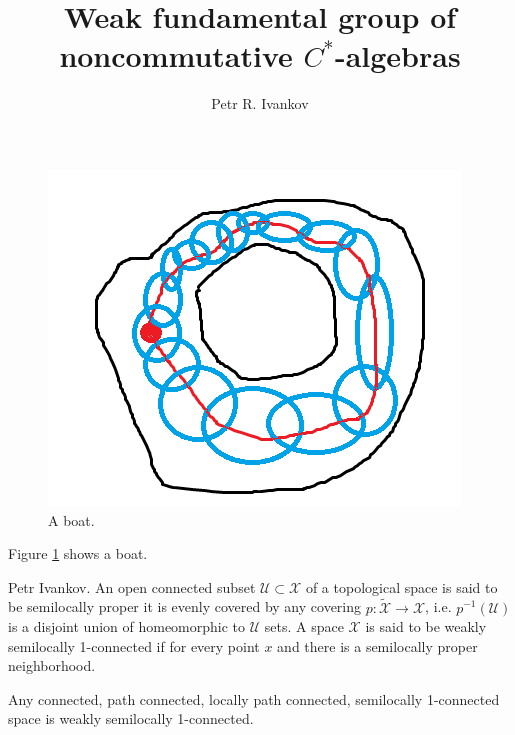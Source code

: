 \documentclass{beamer}
\title{Weak fundamental group of noncommutative $C^*$-algebras}
\institute
{
Algebras in analysis
}
\author{Petr R. Ivankov  }
\theoremstyle{plain}
\newcommand{\sU}{\mathcal{U}}       %
\newcommand{\sX}{\mathcal{X}}       %
\begin{document}
\begin{frame}
  \titlepage
\end{frame}
\begin{frame}

		\begin{figure}
			\includegraphics[width=\linewidth]{PICTURE.png}
			\caption{A boat.}
			\label{fig:boat1}
		\end{figure}
		Figure \ref{fig:boat1} shows a boat.
\end{frame}
\begin{frame}
\begin{definition}\label{top_weakly_semi1_defn}\alert{Petr Ivankov.}
		An open connected subset $\sU\subset \sX$ of a topological space is said to be \alert{semilocally proper} it is evenly covered by any covering $p:\widetilde{\sX}\to\sX$, i.e. $p^{-1}\left(\sU \right)$ is a disjoint union of homeomorphic to $\sU$ sets. 
A space $\sX$ is said to be \alert{weakly semilocally 1-connected} if for  every point $x$ and there is a semilocally proper neighborhood.
\end{definition} 
\begin{example}
	Any connected, path connected, locally path connected, semilocally 1-connected   space is weakly semilocally 1-connected.
\end{example}

\end{frame}
\end{document}
